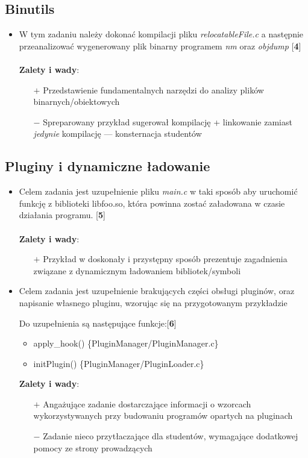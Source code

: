 \documentclass[12pt]{article}
\begin{document}
\subsection{Binutils}
\begin{itemize}
\item W tym zadaniu należy dokonać kompilacji pliku \textit{relocatableFile.c} a
  następnie przeanalizować wygenerowany plik binarny programem \textit{nm} oraz
  \textit{objdump} [\textbf{4}]\\ \\
  \textbf{Zalety i wady}:
  \begin{itemize}
  \item[$+$] Przedstawienie fundamentalnych narzędzi do analizy plików
    binarnych/obiektowych
  \item[$-$] Spreparowany przykład sugerował kompilację + linkowanie zamiast
    \textit{jedynie} kompilację --- konsternacja studentów
  \end{itemize}

\end{itemize}

\subsection{Pluginy i dynamiczne ładowanie}
\begin{itemize}
\item Celem zadania jest uzupełnienie pliku \textit{main.c} w taki sposób aby
  uruchomić funkcję z biblioteki libfoo.so, która powinna zostać załadowana w
  czasie działania programu. [\textbf{5}]\\ \\
  \textbf{Zalety i wady}:
  \begin{itemize}
  \item[$+$] Przykład w doskonały i przystępny sposób prezentuje zagadnienia
    związane z dynamicznym ładowaniem bibliotek/symboli
  \end{itemize}

\item Celem zadania jest uzupełnienie brakujących części obsługi pluginów, oraz
  napisanie własnego pluginu, wzorując się na przygotowanym przykładzie

  Do uzupełnienia są następujące funkcje:[\textbf{6}]

  \begin{itemize}
  \item apply\_hook() \{PluginManager/PluginManager.c\}
  \item initPlugin() \{PluginManager/PluginLoader.c\}
  \end{itemize}
  \textbf{Zalety i wady}:
  \begin{itemize}
  \item[$+$] Angażujące zadanie dostarczające informacji o wzorcach
    wykorzystywanych przy budowaniu programów opartych na pluginach
  \item[$-$] Zadanie nieco przytłaczające dla studentów, wymagające dodatkowej
    pomocy ze strony prowadzących
  \end{itemize}

\end{itemize}
\end{document}
